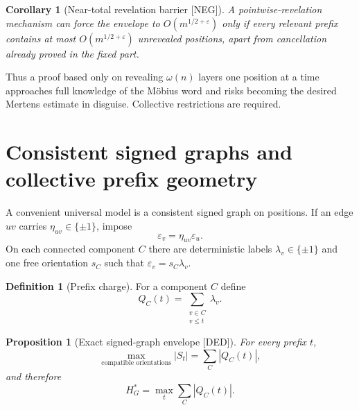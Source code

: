 \documentclass[11pt]{amsart}
\numberwithin{equation}{section}
\theoremstyle{plain}
\newtheorem{proposition}[theorem]{Proposition}
\newtheorem{corollary}[theorem]{Corollary}
\theoremstyle{definition}
\newtheorem{definition}[theorem]{Definition}
\theoremstyle{remark}
\newcommand{\eps}{\varepsilon}
\newcommand{\DED}{\textup{[DED]}}
\newcommand{\NEG}{\textup{[NEG]}}
\begin{document}
\begin{corollary}[Near-total revelation barrier \NEG]
\label{cor:near-total-revelation}
A pointwise-revelation mechanism can force the envelope to
$O(m^{1/2+\eps})$ only if every relevant prefix contains at most
$O(m^{1/2+\eps})$ unrevealed positions, apart from cancellation already proved in the fixed part.
\end{corollary}

Thus a proof based only on revealing $\omega(n)$ layers one position at a time approaches full knowledge of the
M\"obius word and risks becoming the desired Mertens estimate in disguise.  Collective restrictions are required.

\section{Consistent signed graphs and collective prefix geometry}
\label{sec:signed-graph}

A convenient universal model is a consistent signed graph on positions.  If an edge $uv$ carries
$\eta_{uv}\in\{\pm1\}$, impose
\begin{equation}
\varepsilon_v=\eta_{uv}\varepsilon_u.
\label{eq:signed-graph-relation}
\end{equation}
On each connected component $C$ there are deterministic labels $\lambda_v\in\{\pm1\}$ and one
free orientation $s_C$ such that $\varepsilon_v=s_C\lambda_v$.

\begin{definition}[Prefix charge]
\label{def:prefix-charge}
For a component $C$ define
\begin{equation}
Q_C(t)=\sum_{\substack{v\in C\\v\le t}}\lambda_v.
\label{eq:prefix-charge}
\end{equation}
\end{definition}

\begin{proposition}[Exact signed-graph envelope \DED]
\label{prop:signed-graph-envelope}
For every prefix $t$,
\begin{equation}
\max_{\text{compatible orientations}}|S_t|
=
\sum_C|Q_C(t)|,
\label{eq:signed-graph-envelope}
\end{equation}
and therefore
\begin{equation}
H_G^*=\max_t\sum_C|Q_C(t)|.
\label{eq:signed-graph-global-envelope}
\end{equation}
\end{proposition}
\end{document}
